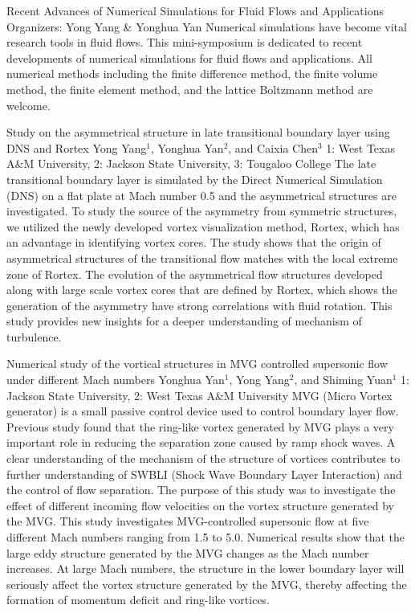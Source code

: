 \label{mini21}

\miniabs
{Recent Advances of Numerical Simulations for Fluid Flows and Applications}
{Organizers: Yong Yang \& Yonghua Yan}
{Numerical simulations have become vital research tools in fluid flows. This mini-symposium is dedicated to recent developments of numerical simulations for fluid flows and applications. All numerical methods including the finite difference method, the finite volume method, the finite element method, and the lattice Boltzmann method are welcome.}

\begin{addmargin}[2em]{0em}
\vspace{2ex}
\abs
{Study on the asymmetrical structure in late transitional boundary layer using DNS and Rortex}
{Yong Yang$^{1}$, Yonghua Yan$^{2}$, and Caixia Chen$^{3}$}
{1: West Texas A\&M University, 2: Jackson State University, 3: Tougaloo College}
{The late transitional boundary layer is simulated by the Direct Numerical Simulation (DNS) on a flat plate at Mach number 0.5 and the asymmetrical structures are investigated. To study the source of the asymmetry from symmetric structures, we utilized the newly developed vortex visualization method, Rortex, which has an advantage in identifying vortex cores. The study shows that the origin of asymmetrical structures of the transitional flow matches with the local extreme zone of Rortex. The evolution of the asymmetrical flow structures developed along with large scale vortex cores that are defined by Rortex, which shows the generation of the asymmetry have strong correlations with fluid rotation. This study provides new insights for a deeper understanding of mechanism of turbulence.}


\vspace{1.5ex}
\abs
{Numerical study of the vortical structures in MVG controlled supersonic flow under different Mach numbers}
{Yonghua Yan$^{1}$, Yong Yang$^{2}$, and Shiming Yuan$^{1}$}
{1: Jackson State University, 2: West Texas A\&M University}
{MVG (Micro Vortex generator) is a small passive control device used to control boundary layer flow. Previous study found that the ring-like vortex generated by MVG plays a very important role in reducing the separation zone caused by ramp shock waves. A clear understanding of the mechanism of the structure of vortices contributes to further understanding of SWBLI (Shock Wave Boundary Layer Interaction) and the control of flow separation. The purpose of this study was to investigate the effect of different incoming flow velocities on the vortex structure generated by the MVG. This study investigates MVG-controlled supersonic flow at five different Mach numbers ranging from 1.5 to 5.0. Numerical results show that the large eddy structure generated by the MVG changes as the Mach number increases. At large Mach numbers, the structure in the lower boundary layer will seriously affect the vortex structure generated by the MVG, thereby affecting the formation of momentum deficit and ring-like vortices.}



\end{addmargin}
